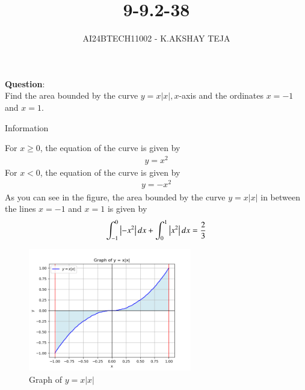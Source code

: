 \documentclass[journal]{IEEEtran}
\begin{document}

\vspace{3cm}

\title{9-9.2-38}
\author{AI24BTECH11002 - K.AKSHAY TEJA}
{\let\newpage\relax\maketitle}

\renewcommand{\thefigure}{\theenumi}
\renewcommand{\thetable}{\theenumi}
\setlength{\intextsep}{10pt} %


\renewcommand{\thetable}{\theenumi}


\textbf{Question}:\\
Find the area bounded by the curve $y = x|x|, x$-axis and the ordinates $x=-1$ and $x=1$.


 \solution
 \begin{table}[h!]
 	\centering
 	
 	\caption{Information}
 	\label{tab:9-9.2-38}
 \end{table}

For $x\geq0$, the equation of the curve is given by 
\begin{align}
    y = x^2
\end{align}
For $x<0$, the equation of the curve is given by 
\begin{align}
    y = -x^2
\end{align}
As you can see in the figure, the area bounded by the curve $y = x|x|$ in between the lines $x = -1$ and $x = 1$ is given by
\begin{align}
	\int_{-1}^{0} \left\vert-x^2\right\vert dx + \int_{0}^{1} \left\vert x^2\right\vert dx = \frac{2}{3} 
\end{align}
 \begin{figure}[h!]
 \begin{center}
 	\includegraphics[width=0.635\textwidth]{Fig/fig.png}
 	\caption{Graph of $ y = x|x|$}
 	\label{fig:9-9.2-38 - Figure -1}
 \end{center}
 \end{figure}
\end{document}
